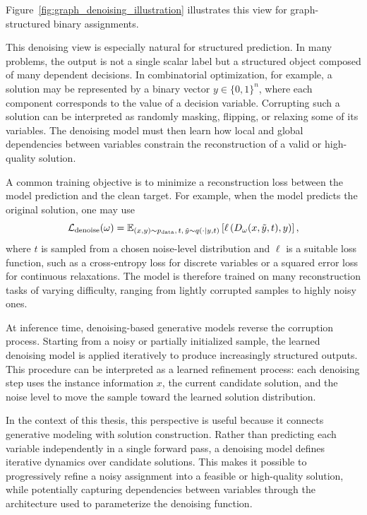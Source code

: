 Figure~\ref{fig:graph_denoising_illustration} illustrates this view for graph-structured binary assignments.



This denoising view is especially natural for structured prediction. In many problems, the output is not a single scalar label but a structured object composed of many dependent decisions. In combinatorial optimization, for example, a solution may be represented by a binary vector $y \in \{0,1\}^n$, where each component corresponds to the value of a decision variable. Corrupting such a solution can be interpreted as randomly masking, flipping, or relaxing some of its variables. The denoising model must then learn how local and global dependencies between variables constrain the reconstruction of a valid or high-quality solution.

A common training objective is to minimize a reconstruction loss between the model prediction and the clean target. For example, when the model predicts the original solution, one may use
\begin{equation}
    \mathcal{L}_{\mathrm{denoise}}(\omega)
    =
    \mathbb{E}_{(x,y)\sim p_{\mathrm{data}},\, t,\, \tilde{y}\sim q(\cdot\mid y,t)}
    \left[
        \ell\left(D_{\omega}(x,\tilde{y},t), y\right)
    \right],
\end{equation}
where $t$ is sampled from a chosen noise-level distribution and $\ell$ is a suitable loss function, such as a cross-entropy loss for discrete variables or a squared error loss for continuous relaxations. The model is therefore trained on many reconstruction tasks of varying difficulty, ranging from lightly corrupted samples to highly noisy ones.

At inference time, denoising-based generative models reverse the corruption process. Starting from a noisy or partially initialized sample, the learned denoising model is applied iteratively to produce increasingly structured outputs. This procedure can be interpreted as a learned refinement process: each denoising step uses the instance information $x$, the current candidate solution, and the noise level to move the sample toward the learned solution distribution.

In the context of this thesis, this perspective is useful because it connects generative modeling with solution construction. Rather than predicting each variable independently in a single forward pass, a denoising model defines iterative dynamics over candidate solutions. This makes it possible to progressively refine a noisy assignment into a feasible or high-quality solution, while potentially capturing dependencies between variables through the architecture used to parameterize the denoising function.

